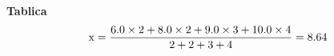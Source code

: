 \documentclass{article}%
\begin{document}
%
\normalsize%
\renewcommand{\arraystretch}{1.5}%
\textbf{\huge Tablica\\}%
%
\Large \[ \text{x} = \frac{%
6.0 \times 2 + 8.0 \times 2 + 9.0 \times 3 + 10.0 \times 4%
}{%
2 + 2 + 3 + 4%
} = 8.64\]%
\end{document}
